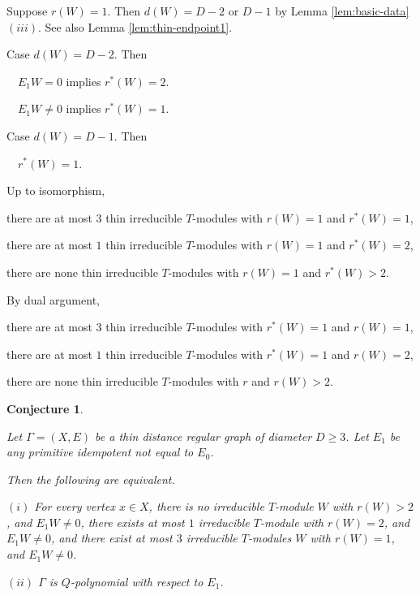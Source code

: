 \documentclass[
]{book}
\newtheorem{conjecture}{Conjecture}[chapter]
\theoremstyle{definition}
\theoremstyle{definition}
\theoremstyle{definition}
\theoremstyle{definition}
\theoremstyle{remark}
\begin{document}
\hfill\break

Suppose \(r(W) = 1\). Then \(d(W) = D-2\) or \(D-1\) by Lemma \ref{lem:basic-data} \((iii)\). See also Lemma \ref{lem:thin-endpoint1}.

Case \(d(W) = D-2\). Then

\(\quad E_1W = 0\) implies \(r^*(W) = 2\).

\(\quad E_1W\neq 0\) implies \(r^*(W) = 1\).

Case \(d(W) = D-1\). Then

\(\quad r^*(W) = 1\).

Up to isomorphism,

there are at most \(3\) thin irreducible \(T\)-modules with \(r(W) =1\) and \(r^*(W)=1\),

there are at most \(1\) thin irreducible \(T\)-modules with \(r(W) = 1\) and \(r^*(W)=2\),

there are none thin irreducible \(T\)-modules with \(r(W) = 1\) and \(r^*(W) > 2\).

By dual argument,

there are at most \(3\) thin irreducible \(T\)-modules with \(r^*(W) =1\) and \(r(W)=1\),

there are at most \(1\) thin irreducible \(T\)-modules with \(r^*(W) = 1\) and \(r(W)=2\),

there are none thin irreducible \(T\)-modules with \(r%
\) and \(r(W) > 2\).

\begin{conjecture}
\protect\hypertarget{cnj:q-polynomial}{}\label{cnj:q-polynomial}

Let \(\Gamma = (X, E)\) be a thin distance regular graph of diameter \(D\geq 3\). Let \(E_1\) be any primitive idempotent not equal to \(E_0\).

Then the following are equivalent.

\((i)\) For every vertex \(x\in X\), there is no irreducible \(T\)-module \(W\) with \(r(W)>2\), and \(E_1W\neq 0\), there exists at most \(1\) irreducible \(T\)-module with \(r(W) =2\), and \(E_1W \neq 0\), and there exist at most \(3\) irreducible \(T\)-modules \(W\) with \(r(W)=1\), and \(E_1W\neq 0\).

\((ii)\) \(\Gamma\) is \(Q\)-polynomial with respect to \(E_1\).

\end{conjecture}
\end{document}
